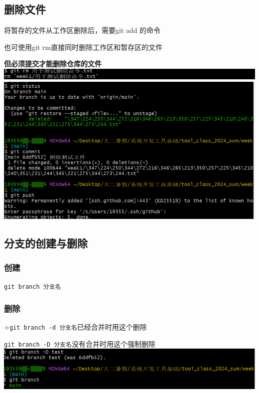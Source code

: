 \documentclass[UTF8,a4paper]{ctexart}
\begin{document}
\subsection{删除文件}
将暂存的文件从工作区删除后，需要git add 的命令\par
也可使用git rm直接同时删除工作区和暂存区的文件\par
\textbf{但必须提交才能删除仓库的文件}\\
\includegraphics[width=1\textwidth]{rm1.png}\\
\includegraphics[width=1\textwidth]{rm2.png}

\subsection{分支的创建与删除}
\subsubsection{创建}
\verb|git branch 分支名|\par


\subsubsection{删除}
+\verb|git branch -d 分支名|\quad 已经合并时用这个删除 \par
\verb|git branch -D 分支名|\quad 没有合并时用这个强制删除\\
\includegraphics[width=1\textwidth]{delete.png}
\end{document}
